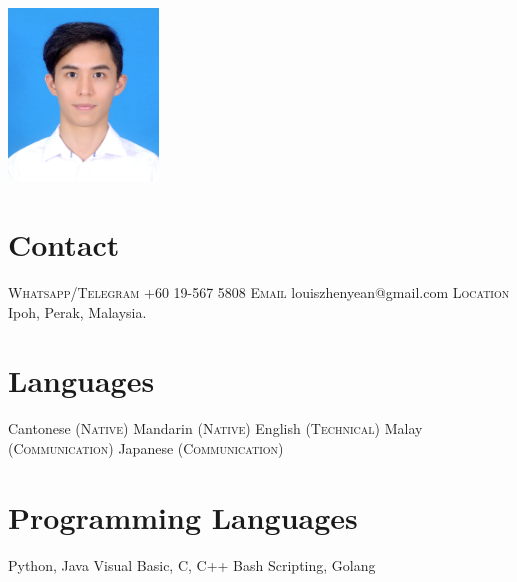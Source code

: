 \documentclass[English]{cv-style}
\begin{document}
\lastupdated

\begin{aside}
\includegraphics[width=4cm]{mypicture.png}
\section{Contact}\vspace{0.15cm}
\textsc{Whatsapp/Telegram}
+60 19-567 5808
\vspace{0.2cm} \textsc{Email}
louiszhenyean@gmail.com
\vspace{0.2cm} \textsc{Location}
Ipoh, Perak, Malaysia.
\section{Languages}\vspace{0.15cm}
Cantonese   \textsc{(Native)}
Mandarin    \textsc{(Native)}
English     \textsc{(Technical)}
Malay       \textsc{(Communication)}
Japanese    \textsc{(Communication)}
\section{Programming Languages}\vspace{0.15cm}
Python, Java
Visual Basic, C, C++
Bash Scripting, Golang

\end{aside}
\end{document}
